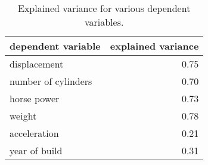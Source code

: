 \begin{table}
  \centering
  \begin{tabular}{|l|r|}
  \hline
  dependent variable  & explained variance   \\
  \hline
  \hline
  displacement        & 0.75                 \\
  \hline
  number of cylinders & 0.70                 \\
  \hline
  horse power         & 0.73                 \\
  \hline
  weight              & 0.78                 \\
  \hline
  acceleration        & 0.21                 \\
  \hline
  year of build       & 0.31                 \\
  \hline
  \end{tabular}
  \caption[explained variance]{Explained variance for various dependent variables.}
  \label{tab:explained-variance}
\end{table}


